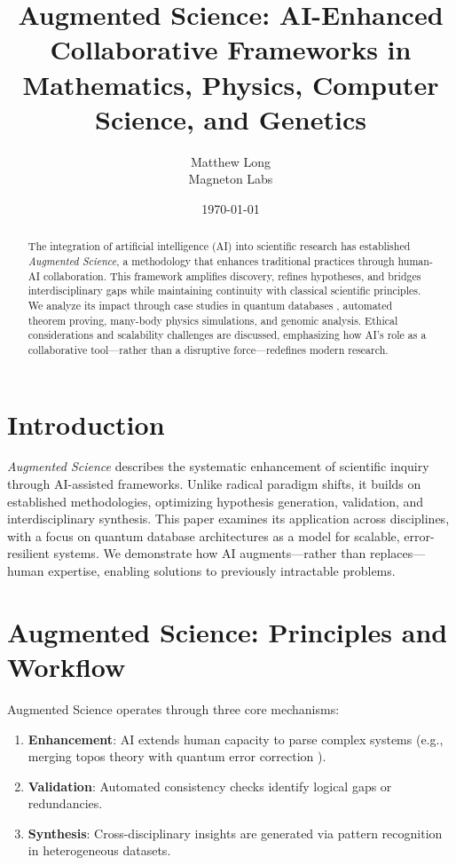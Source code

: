 \documentclass[12pt, a4paper]{article}
\title{Augmented Science: AI-Enhanced Collaborative Frameworks in Mathematics, Physics, Computer Science, and Genetics}
\author{Matthew Long \\
Magneton Labs}
\date{\today}
\begin{document}
\maketitle

\begin{abstract}
The integration of artificial intelligence (AI) into scientific research has established \textit{Augmented Science}, a methodology that enhances traditional practices through human-AI collaboration. This framework amplifies discovery, refines hypotheses, and bridges interdisciplinary gaps while maintaining continuity with classical scientific principles. We analyze its impact through case studies in quantum databases \cite{quantum_databases_expanded, dist_qdb_qec_framework}, automated theorem proving, many-body physics simulations, and genomic analysis. Ethical considerations and scalability challenges are discussed, emphasizing how AI's role as a collaborative tool—rather than a disruptive force—redefines modern research.
\end{abstract}

\section{Introduction}
\textit{Augmented Science} describes the systematic enhancement of scientific inquiry through AI-assisted frameworks. Unlike radical paradigm shifts, it builds on established methodologies, optimizing hypothesis generation, validation, and interdisciplinary synthesis. This paper examines its application across disciplines, with a focus on quantum database architectures \cite{quantum_databases_expanded} as a model for scalable, error-resilient systems. We demonstrate how AI augments—rather than replaces—human expertise, enabling solutions to previously intractable problems.

\section{Augmented Science: Principles and Workflow}
Augmented Science operates through three core mechanisms:
\begin{enumerate}
    \item \textbf{Enhancement}: AI extends human capacity to parse complex systems (e.g., merging topos theory with quantum error correction \cite{dist_qdb_qec_framework}).
    \item \textbf{Validation}: Automated consistency checks identify logical gaps or redundancies.
    \item \textbf{Synthesis}: Cross-disciplinary insights are generated via pattern recognition in heterogeneous datasets.
\end{enumerate}
\end{document}
